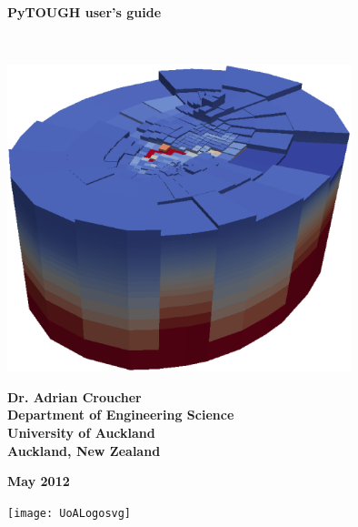 \begin{titlepage}

\begin{center}

\bigskip\

\textbf{\Huge{PyTOUGH user's guide}}

\bigskip\

\includegraphics[width=0.75\textwidth]{coverpic}

\bigskip

\textbf{\large{Dr. Adrian Croucher\\
Department of Engineering Science\\
University of Auckland\\
Auckland, New Zealand}}

\bigskip

\textbf{\large{May 2012}}

\bigskip
\bigskip
\bigskip
\bigskip
\bigskip

\texttt{[image: UoALogosvg]}

\end{center}
\end{titlepage}

